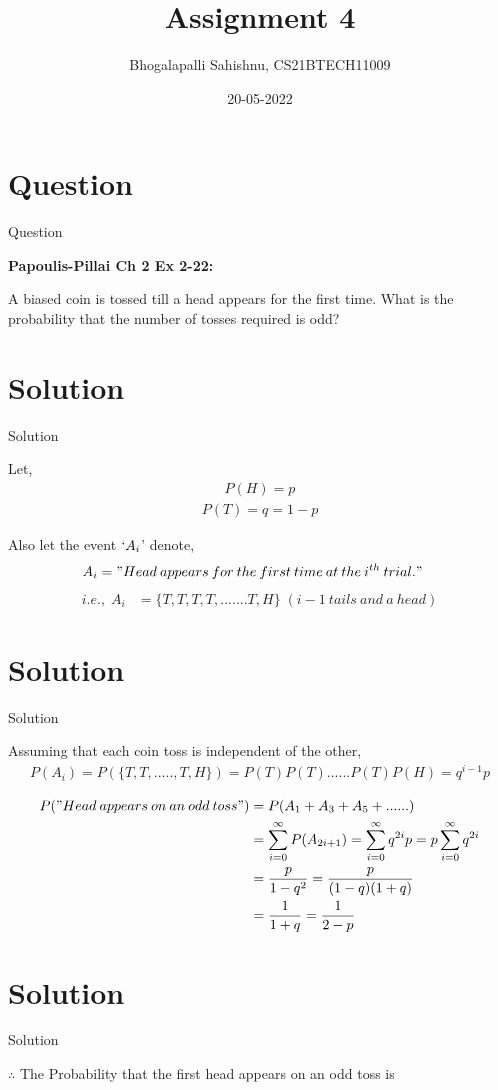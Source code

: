\documentclass{beamer}
\title{Assignment 4}
\author{Bhogalapalli Sahishnu, CS21BTECH11009}
\date{20-05-2022}
\begin{document}
\begin{frame}
\titlepage
\end{frame}

\section{Question}
\begin{frame}{Question}

\textbf{Papoulis-Pillai Ch 2 Ex 2-22: }

A biased coin is tossed till a head appears for the first time. What is the probability that the number of tosses required is odd?
\end{frame}

\section{Solution}
\begin{frame}{Solution}

Let,
\begin{align}
    P(H) = p
\end{align}
\begin{align}
    P(T) = q = 1-p
\end{align}

Also let the event $`A_i$' denote,
\begin{align}
    A_i &= "Head\:appears\:for\:the\:first\:time\:at\:the\:i^{th}\:trial."
\end{align}
\begin{align}
     i.e., \; A_i &= \{T,T,T,T,.......T,H\} \; (i-1\:tails\:and\:a\:head)
\end{align}
\end{frame}

\section{Solution}
\begin{frame}{Solution}

Assuming that each coin toss is independent of the other,
\begin{align}
    P(A_i) = P(\{T,T,.....,T,H\}) = P(T) P(T) ...... P(T) P(H) = q^{i-1}  p
\end{align}

\begin{align}
    \begin{split}
        P("Head\:appears\:on\:an\:odd\:toss")  &= P(A_1 + A_3 + A_5 + ......)\\
        &= \sum_{i=0} ^{\infty} P(A_{2i+1}) = \sum_{i=0} ^{\infty} q^{2i} p = p \sum_{i=0} ^{\infty} q^{2i}\\
        &= \frac{p}{1-q^2} = \frac{p}{(1-q)(1+q)}\\
        &= \frac{1}{1+q} = \frac{1}{2-p}
    \end{split}
\end{align}
\end{frame}

\section{Solution}
\begin{frame}{Solution}

$\therefore$ The Probability that the first head appears on an odd toss is  
\end{frame}
\end{document}
